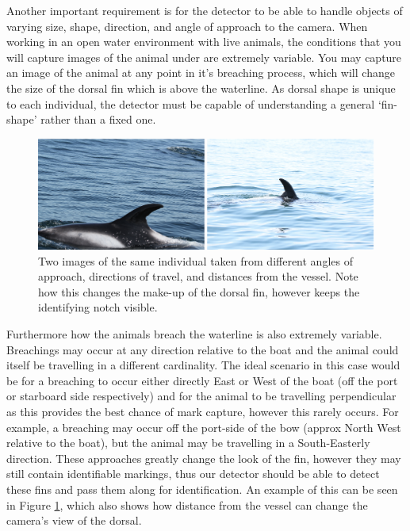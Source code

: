  Another important requirement is for the detector to be able to handle objects of varying size, shape, direction, and angle of approach to the camera. When working in an open water environment with live animals, the conditions that you will capture images of the animal under are extremely variable. You may capture an image of the animal at any point in it's breaching process, which will change the size of the dorsal fin which is above the waterline. As dorsal shape is unique to each individual, the detector must be capable of understanding a general `fin-shape' rather than a fixed one. 
 
  \begin{figure}
 	\begin{center}
 		\includegraphics[scale=0.6]{Chapter3/figs/angle-size-example.png}
 	\end{center}
 	\caption{Two images of the same individual taken from different angles of approach, directions of travel, and distances from the vessel. Note how this changes the make-up of the dorsal fin, however keeps the identifying notch visible. 
 	}
 	\label{fig:angle-eg}
 \end{figure}
 
 Furthermore how the animals breach the waterline is also extremely variable. Breachings may occur at any  direction relative to the boat and the animal could itself be travelling in a different cardinality. The ideal scenario in this case would be for a breaching to occur either directly East or West of the boat (off the port or starboard side respectively) and for the animal to be travelling perpendicular as this provides the best chance of mark capture, however this rarely occurs. For example, a breaching may occur off the port-side of the bow (approx North West relative to the boat), but the animal may be travelling in a South-Easterly direction. These approaches greatly change the look of the fin, however they may still contain identifiable markings, thus our detector should be able to detect these fins and pass them along for identification. An example of this can be seen in Figure \ref{fig:angle-eg}, which also shows how distance from the vessel can change the camera's view of the dorsal. 
 
